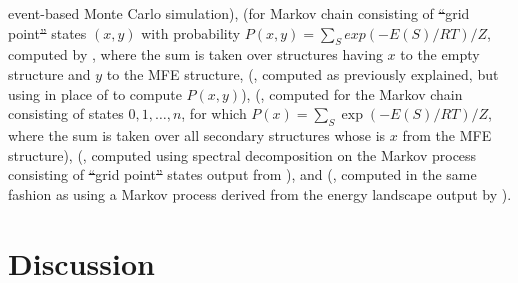 \documentclass[11pt, oneside]{Thesis} %
\providecommand{\DIFadd}[1]{{\protect\color{blue}\uwave{#1}}} %
\providecommand{\DIFdel}[1]{{\protect\color{red}\sout{#1}}}                      %
\providecommand{\DIFaddFL}[1]{\DIFadd{#1}} %
\providecommand{\DIFdelFL}[1]{\DIFdel{#1}} %
\providecommand{\DIFaddbeginFL}{} %
\providecommand{\DIFaddendFL}{} %
\providecommand{\DIFdelbeginFL}{} %
\providecommand{\DIFdelendFL}{} %
\begin{document}
\begin{landscape}
\begin{table}[!ht]
{ event-based Monte Carlo simulation), \fftmfpt (\mfpt for Markov chain consisting of \DIFdelbeginFL \DIFdelFL{``}\DIFdelendFL \DIFaddbeginFL \DIFaddFL{`}\DIFaddendFL grid point\DIFdelbeginFL \DIFdelFL{'' }\DIFdelendFL \DIFaddbeginFL \DIFaddFL{'
 }\DIFaddendFL states $(x,y)$ with probability \DIFdelbeginFL \DIFdelFL{$P(x,y)=\sum_S exp(-E(S)/RT)/Z$}\DIFdelendFL \DIFaddbeginFL \DIFaddFL{$P(x,y)=\sum_\str \frac{\boltzf{\str}}{\fullZ}$}\DIFaddendFL , computed by \ffttwo,
 where the sum is taken over structures having \bpd $x$ to the empty structure and $y$ to the MFE
 structure, \rnatwofold (\mfpt, computed as previously explained, but using \rnatwofold in place
 of \ffttwo to compute $P(x,y)$), \fftbor (\mfpt, computed for the Markov chain consisting of
 states $0,1,\dots,n$, for which \DIFdelbeginFL \DIFdelFL{$P(x) = \sum_S \exp(-E(S)/RT)/Z$}\DIFdelendFL \DIFaddbeginFL \DIFaddFL{$P(x) = \sum_\str \frac{\boltzf{\str}}{\fullZ}$}\DIFaddendFL , where the
 sum is taken over all secondary structures whose \bpd is $x$ from the MFE structure), \DIFdelbeginFL %
\DIFdelendFL \DIFaddbeginFL \barrierseq
 \DIFaddendFL (\eqt, computed using spectral decomposition on the Markov process consisting of \DIFdelbeginFL \DIFdelFL{``}\DIFdelendFL \DIFaddbeginFL \DIFaddFL{`}\DIFaddendFL grid point\DIFdelbeginFL \DIFdelFL{'' }\DIFdelendFL \DIFaddbeginFL \DIFaddFL{'
 }\DIFaddendFL states output from \DIFdelbeginFL %
\DIFdelendFL \DIFaddbeginFL \barriers\DIFaddendFL ), and \ffteq (\eqt, computed in the same fashion as \DIFdelbeginFL %
\DIFdelendFL \DIFaddbeginFL \barrierseq
 \DIFaddendFL using a Markov process derived from the energy landscape output by \ffttwo).}
\label{table:correlationHermes}
 \end{table}
 \end{landscape}


\chapter{Discussion}
\label{ch:disc}

\end{document}
